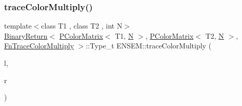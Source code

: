\mbox{\label{group__primcolormatrix_ga690c734a59a0c81041165c0fe948ef2d}} 
\subsubsection{\texorpdfstring{traceColorMultiply()}{traceColorMultiply()}\hspace{0.1cm}{\footnotesize\ttfamily [1/3]}}
{\footnotesize\ttfamily template$<$class T1 , class T2 , int N$>$ \\
\mbox{\hyperlink{structENSEM_1_1BinaryReturn}{Binary\+Return}}$<$ \mbox{\hyperlink{classENSEM_1_1PColorMatrix}{P\+Color\+Matrix}}$<$ T1, \mbox{\hyperlink{operator__name__util_8cc_a7722c8ecbb62d99aee7ce68b1752f337}{N}} $>$, \mbox{\hyperlink{classENSEM_1_1PColorMatrix}{P\+Color\+Matrix}}$<$ T2, \mbox{\hyperlink{operator__name__util_8cc_a7722c8ecbb62d99aee7ce68b1752f337}{N}} $>$, \mbox{\hyperlink{structENSEM_1_1FnTraceColorMultiply}{Fn\+Trace\+Color\+Multiply}} $>$\+::Type\+\_\+t E\+N\+S\+E\+M\+::trace\+Color\+Multiply (\begin{DoxyParamCaption}\item[{const \mbox{\hyperlink{classENSEM_1_1PColorMatrix}{P\+Color\+Matrix}}$<$ T1, \mbox{\hyperlink{operator__name__util_8cc_a7722c8ecbb62d99aee7ce68b1752f337}{N}} $>$ \&}]{l,  }\item[{const \mbox{\hyperlink{classENSEM_1_1PColorMatrix}{P\+Color\+Matrix}}$<$ T2, \mbox{\hyperlink{operator__name__util_8cc_a7722c8ecbb62d99aee7ce68b1752f337}{N}} $>$ \&}]{r }\end{DoxyParamCaption})\hspace{0.3cm}{\ttfamily [inline]}}

\mbox{\label{group__primcolormatrix_gac1ebb50e5da5705b401fc6a361b951c5}} 
